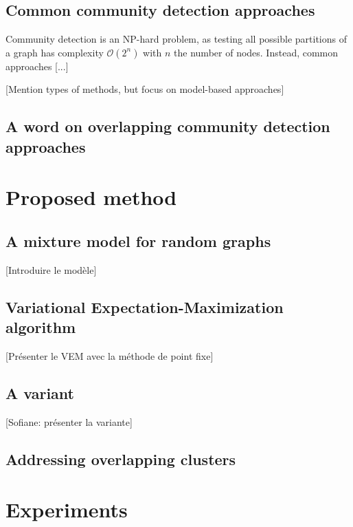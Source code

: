 \documentclass[11pt]{article}
\renewcommand{\O}{\mathcal{O}}
\begin{document}
\subsection{Common community detection approaches}

Community detection is an NP-hard problem, as testing all possible partitions of a graph has complexity $\O(2^n)$ with $n$ the number of nodes. Instead, common approaches [...]

    [Mention types of methods, but focus on model-based approaches]

\subsection{A word on overlapping community detection approaches}




\section{Proposed method}
\label{sec:method}

\cite{main_article}

\subsection{A mixture model for random graphs}

[Introduire le modèle]


\subsection{Variational Expectation-Maximization algorithm}

[Présenter le VEM avec la méthode de point fixe]


\subsection{A variant}

[Sofiane: présenter la variante]


\subsection{Addressing overlapping clusters}



\section{Experiments}
\label{sec:experiments}
\end{document}
